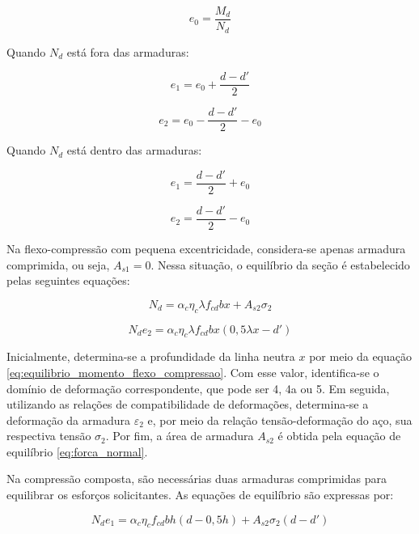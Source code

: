 \begin{equation}
e_0 = \frac{M_d}{N_d}
\end{equation}

Quando $N_{d}$ está fora das armaduras:

\begin{equation}
e_1 = e_0 + \frac{d - d'}{2}
\end{equation}

\begin{equation}
e_2 = e_0 - \frac{d - d'}{2} - e_0
\end{equation}

Quando $N_{d}$ está dentro das armaduras:

\begin{equation}
e_1 = \frac{d - d'}{2} + e_0
\end{equation}

\begin{equation}
e_2 = \frac{d - d'}{2} - e_0
\end{equation}

Na flexo-compressão com pequena excentricidade, considera-se apenas armadura comprimida, ou seja, $A_{s1}=0$. Nessa situação, o equilíbrio da seção é estabelecido pelas seguintes equações:

\begin{equation}
N_d = \alpha_c \eta_c \lambda f_{cd} b x + A_{s2}\sigma_2
\label{eq:forca_normal}
\end{equation}

\begin{equation}
N_d e_2 =
\alpha_c \eta_c \lambda f_{cd} b x
\left(0,5\lambda x-d'\right)
\label{eq:equilibrio_momento_flexo_compressao}
\end{equation}

Inicialmente, determina-se a profundidade da linha neutra $x$ por meio da equação \ref{eq:equilibrio_momento_flexo_compressao}. Com esse valor, identifica-se o domínio de deformação correspondente, que pode ser 4, 4a ou 5. Em seguida, utilizando as relações de compatibilidade de deformações, determina-se a deformação da armadura $\varepsilon_{2}$ e, por meio da relação tensão-deformação do aço, sua respectiva tensão $\sigma_2$. Por fim, a área de armadura $A_{s2}$ é obtida pela equação de equilíbrio \ref{eq:forca_normal}.

Na compressão composta, são necessárias duas armaduras comprimidas para equilibrar os esforços solicitantes. As equações de equilíbrio são expressas por:

\begin{equation}
N_d e_1 =
\alpha_c \eta_c f_{cd} b h
\left(d-0,5h\right)
+A_{s2}\sigma_2(d-d')
\end{equation}

